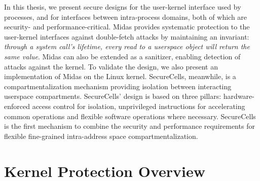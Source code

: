 In this thesis, we present secure designs 
for the user-kernel interface used by processes, and 
for interfaces between intra-process domains, 
both of which are security- and performance-critical.
Midas provides systematic protection to the user-kernel interfaces against
double-fetch attacks by maintaining an invariant:
\emph{through a system call's lifetime, every read to a userspace object
will return the same value}.
Midas can also be extended as a sanitizer, enabling detection of \tocttou
attacks against the kernel.
To validate the design, we also present an implementation of Midas on the
Linux kernel.
SecureCells, meanwhile, is a compartmentalization mechanism providing isolation
between interacting userspace compartments.
SecureCells' design is based on three pillars: hardware-enforced access 
control for isolation, unprivileged instructions for accelerating common
operations and flexible software operations where necessary.
SecureCells is the first mechanism to combine the security and performance
requirements for flexible fine-grained intra-address space 
compartmentalization.


\section{Kernel \tocttou Protection Overview}

